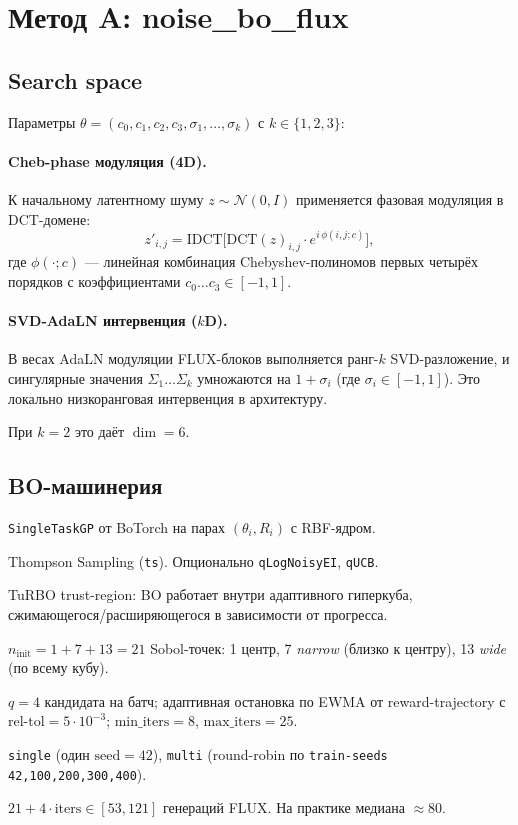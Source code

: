 \documentclass[11pt,a4paper]{article}
\begin{document}
\section{Метод A: noise\_bo\_flux}

\subsection{Search space}

Параметры $\theta = (c_0, c_1, c_2, c_3, \sigma_1, \ldots, \sigma_k)$
с $k \in \{1,2,3\}$:

\paragraph{Cheb-phase модуляция (4D).}
К начальному латентному шуму $z \sim \mathcal{N}(0,I)$ применяется
фазовая модуляция в DCT-домене:
\[
  z'_{i,j} = \mathrm{IDCT}\bigl[\mathrm{DCT}(z)_{i,j} \cdot e^{i\,\phi(i,j;c)}\bigr],
\]
где $\phi(\cdot;c)$ --- линейная комбинация Chebyshev-полиномов первых
четырёх порядков с коэффициентами $c_0\ldots c_3 \in [-1,1]$.

\paragraph{SVD-AdaLN интервенция ($k$D).}
В весах AdaLN модуляции FLUX-блоков выполняется ранг-$k$ SVD-разложение,
и сингулярные значения $\Sigma_1 \ldots \Sigma_k$ умножаются на
$1+\sigma_i$ (где $\sigma_i \in [-1,1]$). Это локально низкоранговая
интервенция в архитектуру.

При $k=2$ это даёт $\dim = 6$.

\subsection{BO-машинерия}

\begin{description}[leftmargin=1.5em,style=nextline]
  \item[Surrogate] \texttt{SingleTaskGP} от BoTorch на парах
  $(\theta_i, R_i)$ с RBF-ядром.
  \item[Acquisition] Thompson Sampling (\texttt{ts}). Опционально
  \texttt{qLogNoisyEI}, \texttt{qUCB}.
  \item[Поиск] TuRBO trust-region: BO работает внутри адаптивного
  гиперкуба, сжимающегося/расширяющегося в зависимости от прогресса.
  \item[Init] $n_\text{init} = 1 + 7 + 13 = 21$ Sobol-точек: 1 центр,
  7 \emph{narrow} (близко к центру), 13 \emph{wide} (по всему кубу).
  \item[Итерации] $q=4$ кандидата на батч; адаптивная остановка по EWMA
  от reward-trajectory с $\text{rel-tol} = 5\!\cdot\!10^{-3}$;
  $\text{min\_iters} = 8$, $\text{max\_iters} = 25$.
  \item[Режимы] \texttt{single} (один $\text{seed}=42$),
  \texttt{multi} (round-robin по \texttt{train-seeds 42,100,200,300,400}).
  \item[Бюджет/промпт] $21 + 4\cdot \text{iters} \in [53, 121]$ генераций
  FLUX. На практике медиана $\approx 80$.
\end{description}
\end{document}
